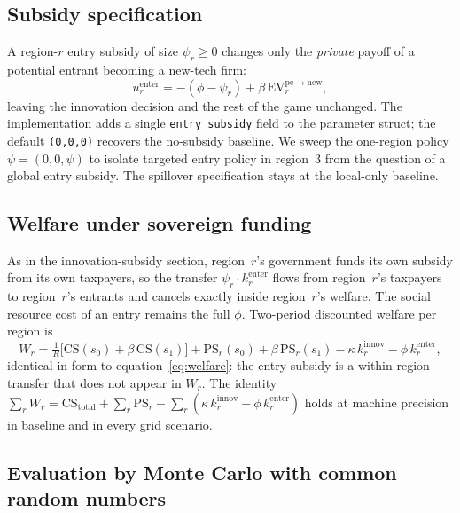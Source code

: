 \documentclass[12pt]{article}
\begin{document}
\subsection{Subsidy specification}

A region-$r$ entry subsidy of size $\psi_r \ge 0$ changes only the
\emph{private} payoff of a potential entrant becoming a new-tech firm:
\begin{equation}
  u^{\mathrm{enter}}_r = -(\phi - \psi_r) + \beta\,
  \mathrm{EV}^{\mathrm{pe}\to\mathrm{new}}_r,
  \label{eq:entry_subsidy_payoff}
\end{equation}
leaving the innovation decision and the rest of the game unchanged.
The implementation adds a single \texttt{entry\_subsidy} field to the
parameter struct; the default \texttt{(0,0,0)} recovers the
no-subsidy baseline. We sweep the one-region policy
$\psi = (0, 0, \psi)$ to isolate targeted entry policy in region~3
from the question of a global entry subsidy. The spillover
specification stays at the local-only baseline.

\subsection{Welfare under sovereign funding}

As in the innovation-subsidy section, region~$r$'s government funds
its own subsidy from its own taxpayers, so the transfer
$\psi_r \cdot k^{\mathrm{enter}}_r$ flows from region~$r$'s taxpayers
to region~$r$'s entrants and cancels exactly inside region~$r$'s
welfare. The social resource cost of an entry remains the full
$\phi$. Two-period discounted welfare per region is
\begin{equation}
  W_r
    = \tfrac{1}{R}\bigl[\mathrm{CS}(s_0) + \beta\, \mathrm{CS}(s_1)\bigr]
    + \mathrm{PS}_r(s_0) + \beta\, \mathrm{PS}_r(s_1)
    - \kappa\, k^{\mathrm{innov}}_r - \phi\, k^{\mathrm{enter}}_r,
  \label{eq:welfare_entry_subsidy}
\end{equation}
identical in form to equation~\eqref{eq:welfare}: the entry subsidy is
a within-region transfer that does not appear in $W_r$. The identity
$\sum_r W_r = \mathrm{CS}_{\mathrm{total}} + \sum_r \mathrm{PS}_r
- \sum_r (\kappa\, k^{\mathrm{innov}}_r + \phi\, k^{\mathrm{enter}}_r)$
holds at machine precision in baseline and in every grid scenario.

\subsection{Evaluation by Monte Carlo with common random numbers}
\end{document}
